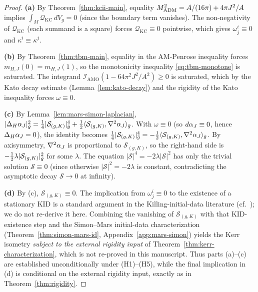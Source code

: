 \begin{proof}
\textbf{(a)} By Theorem~\ref{thm:kcii-main}, equality $M_{\mathrm{ADM}}^2 = A/(16\pi) + 4\pi J^2/A$ implies $\int_M \mathcal{Q}_{\mathrm{KC}} \, dV_g = 0$ (since the boundary term vanishes). The non-negativity of $\mathcal{Q}_{\mathrm{KC}}$ (each summand is a square) forces $\mathcal{Q}_{\mathrm{KC}} \equiv 0$ pointwise, which gives $\omega^i_j \equiv 0$ and $\kappa^i \equiv \kappa^j$.

\textbf{(b)} By Theorem~\ref{thm:tbm-main}, equality in the AM-Penrose inequality forces $m_{H,J}(0) = m_{H,J}(1)$, so the monotonicity inequality \eqref{eq:tbm-monotone} is saturated. The integrand $\mathcal{I}_{\mathrm{AMO}}(1 - 64\pi^2 J^2/A^2) \geq 0$ is saturated, which by the Kato decay estimate (Lemma~\ref{lem:kato-decay}) and the rigidity of the Kato inequality forces $\omega \equiv 0$.

\textbf{(c)} By Lemma~\ref{lem:mars-simon-laplacian}, $|\Delta_H \alpha_J|_{\bar{g}}^2 = \tfrac{1}{4}|\mathcal{S}_{(g,K)}|_{\bar{g}}^4 + \tfrac{1}{2}\langle \mathcal{S}_{(g,K)}, \nabla^2 \alpha_J \rangle_{\bar{g}}$. With $\omega \equiv 0$ (so $d\alpha_J \equiv 0$, hence $\Delta_H \alpha_J = 0$), the identity becomes $\tfrac{1}{4}|\mathcal{S}_{(g,K)}|_{\bar{g}}^4 = -\tfrac{1}{2}\langle \mathcal{S}_{(g,K)}, \nabla^2 \alpha_J \rangle_{\bar{g}}$. By axisymmetry, $\nabla^2 \alpha_J$ is proportional to $\mathcal{S}_{(g,K)}$, so the right-hand side is $-\tfrac{1}{2}\lambda|\mathcal{S}_{(g,K)}|_{\bar{g}}^2$ for some $\lambda$. The equation $|\mathcal{S}|^4 = -2\lambda|\mathcal{S}|^2$ has only the trivial solution $\mathcal{S} \equiv 0$ (since otherwise $|\mathcal{S}|^2 = -2\lambda$ is constant, contradicting the asymptotic decay $\mathcal{S} \to 0$ at infinity).

\textbf{(d)} By (c), $\mathcal{S}_{(g,K)} \equiv 0$. The implication from $\omega^i_j \equiv 0$ to the existence of a stationary KID is a standard argument in the Killing-initial-data literature (cf.\ \cite{beigchrusciel1996, anderssonmarssimonfaller2008}); we do not re-derive it here. Combining the vanishing of $\mathcal{S}_{(g,K)}$ with that KID-existence step and the Simon--Mars initial-data characterization (Theorem~\ref{thm:simon-mars-id}, Appendix~\ref{app:mars-simon}) yields the Kerr isometry \emph{subject to the external rigidity input} of Theorem~\ref{thm:kerr-characterization}, which is not re-proved in this manuscript. Thus parts (a)--(c) are established unconditionally under (H1)--(H5), while the final implication in (d) is conditional on the external rigidity input, exactly as in Theorem~\ref{thm:rigidity}.
\end{proof}

